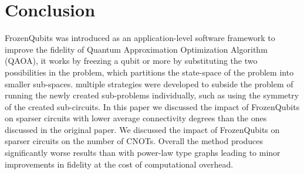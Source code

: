 \section{Conclusion}
FrozenQubits was introduced as an application-level software framework to improve the fidelity of Quantum Approximation Optimization Algorithm (QAOA), it works by freezing a qubit or more by substituting the two possibilities in the problem, which partitions the state-space of the problem into smaller sub-spaces. multiple strategies were developed to subside the problem of running the newly created sub-problems individually, such as using the symmetry of the created sub-circuits. In this paper we discussed the impact of FrozenQubits on sparser circuits with lower average connectivity degrees than the ones discussed in the original paper. We discussed the impact of FrozenQubits on sparser circuits on the number of CNOTs. Overall the method produces significantly worse results than with power-law type graphs leading to minor improvements in fidelity at the cost of computational overhead. 





